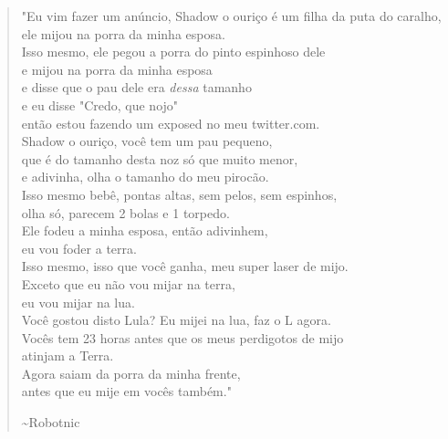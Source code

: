 \newpage
\vfill %

\begin{center}
\selectfont %
\large %

\begin{verse}
    "Eu vim fazer um anúncio, Shadow o ouriço é um filha da puta do caralho,\\
    ele mijou na porra da minha esposa. \\[1em]

    Isso mesmo, ele pegou a porra do pinto espinhoso dele\\
    e mijou na porra da minha esposa\\
    e disse que o pau dele era \textit{dessa} tamanho\\
    e eu disse "Credo, que nojo"\\
    então estou fazendo um exposed no meu twitter.com. \\[1em]

    Shadow o ouriço, você tem um pau pequeno,\\
    que é do tamanho desta noz só que muito menor,\\
    e adivinha, olha o tamanho do meu pirocão. \\[1em]

    Isso mesmo bebê, pontas altas, sem pelos, sem espinhos,\\
    olha só, parecem 2 bolas e 1 torpedo. \\[1em]

    Ele fodeu a minha esposa, então adivinhem,\\
    eu vou foder a terra.\\
    Isso mesmo, isso que você ganha, meu super laser de mijo. \\[1em]

    Exceto que eu não vou mijar na terra,\\
    eu vou mijar na lua. \\[1em]

    Você gostou disto Lula? Eu mijei na lua, faz o L agora.\\
    Vocês tem 23 horas antes que os meus perdigotos de mijo\\
    atinjam a Terra. \\[1em]

    Agora saiam da porra da minha frente,\\
    antes que eu mije em vocês também."

    \hfill \textasciitilde Robotnic %
\end{verse}
\end{center}

